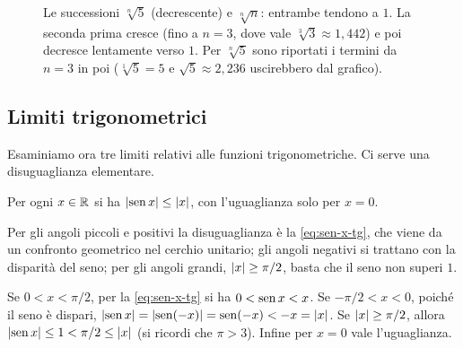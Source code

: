 \begin{figure}[htb]
\centering
{}
\caption{Le successioni $\sqrt[n]5$ (decrescente) e $\sqrt[n]n$: entrambe tendono a $1$.
La seconda prima cresce (fino a $n=3$, dove vale $\sqrt[3]3\approx1{,}442$) e poi decresce
lentamente verso $1$. Per $\sqrt[n]5$ sono riportati i termini da $n=3$ in poi
($\sqrt[1]5=5$ e $\sqrt5\approx2{,}236$ uscirebbero dal grafico).}
\label{fig:radici-n}
\end{figure}

\subsection{Limiti trigonometrici}

Esaminiamo ora tre limiti relativi alle funzioni trigonometriche. Ci serve una
disuguaglianza elementare.

\begin{lemma}\label{lem:sen-minore-x}
Per ogni $x\in\mathbb{R}$ si ha $\lvert \operatorname{sen} x\rvert\le\lvert x\rvert$, con l'uguaglianza solo per $x=0$.
\end{lemma}

\begin{schema}
\end{schema}

\begin{strategia}
Per gli angoli piccoli e positivi la disuguaglianza è la \eqref{eq:sen-x-tg}, che viene
da un confronto geometrico nel cerchio unitario; gli angoli negativi si trattano con la disparità del
seno; per gli angoli grandi, $\lvert x\rvert\ge\pi/2$, basta che il seno non superi $1$.
\end{strategia}

\begin{dimostrazione}
Se $0<x<\pi/2$, per la \eqref{eq:sen-x-tg} si ha $0<\operatorname{sen} x<x$. Se $-\pi/2<x<0$, poiché il
seno è dispari, $\lvert \operatorname{sen} x\rvert=\lvert \operatorname{sen}(-x)\rvert=\operatorname{sen}(-x)<-x=\lvert x\rvert$. Se $\lvert x\rvert\ge\pi/2$,
allora $\lvert \operatorname{sen} x\rvert\le1<\pi/2\le\lvert x\rvert$ (si ricordi che $\pi>3$). Infine per $x=0$ vale
l'uguaglianza.
\end{dimostrazione}

